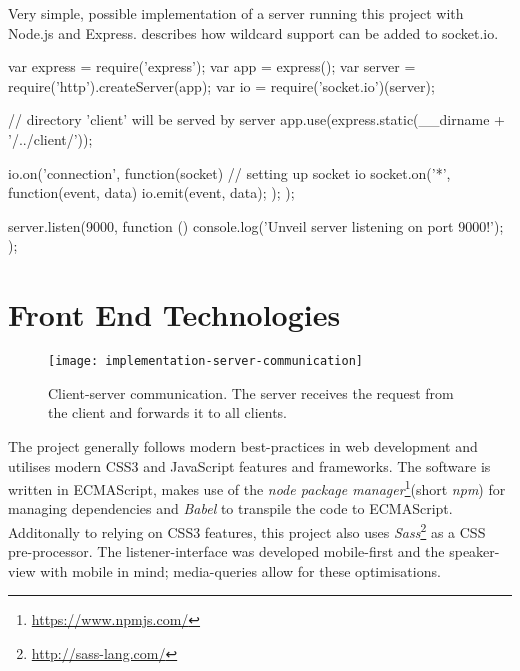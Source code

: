 
\begin{program}
\caption{Very simple, possible implementation of a server running this project with Node.js and Express. \cite{socket-io-wildcards} describes how wildcard support can be added to socket.io.}
\label{prog:implementation-server-code}
\begin{JsCode}
var express = require('express'); var app = express();
var server = require('http').createServer(app);
var io = require('socket.io')(server);

// directory 'client' will be served by server
app.use(express.static(__dirname + '/../client/'));

io.on('connection', function(socket) { // setting up socket io
  socket.on('*', function(event, data) {
    io.emit(event, data);
  });
});

server.listen(9000, function () {
  console.log('Unveil server listening on port 9000!');
});
\end{JsCode}
\end{program}

\section{Front End Technologies}
\label{sec:implementation-technologies}

\begin{figure}
\centering
\texttt{[image: implementation-server-communication]}
\caption{Client-server communication. The server receives the request from the client and forwards it to all clients.}
\label{fig:implementation-client-server-communication}
\end{figure}

The project generally follows modern best-practices in web development and utilises modern CSS3 and JavaScript features and frameworks. The software is written in ECMA\-Script, makes use of the \emph{node package manager}\footnote{\url{https://www.npmjs.com/}}(short \emph{npm}) for managing dependencies and \emph{Babel} to transpile the code to ECMA\-Script. Additonally to relying on CSS3 features, this project also uses \emph{Sass}\footnote{\url{http://sass-lang.com/}} as a CSS pre-processor. The listener-interface was developed mobile-first and the speaker-view with mobile in mind; media-queries allow for these optimisations.

